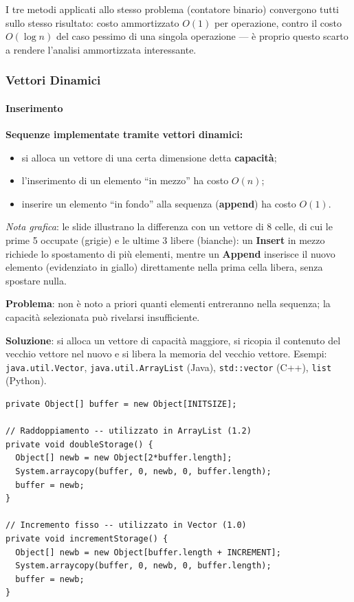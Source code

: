 \documentclass[12pt, a4paper]{article}
\begin{document}
\begin{tcolorbox}[colback=lightergray!5, colframe=tocsubsec, title=\textbf{Nota}]
I tre metodi applicati allo stesso problema (contatore binario) convergono tutti sullo stesso risultato: costo ammortizzato $O(1)$ per operazione, contro il costo $O(\log n)$ del caso pessimo di una singola operazione — è proprio questo scarto a rendere l'analisi ammortizzata interessante.
\end{tcolorbox}



\subsubsection{Vettori Dinamici}

\paragraph{Inserimento}

\textbf{Sequenze implementate tramite vettori dinamici:}
\begin{itemize}
    \item si alloca un vettore di una certa dimensione detta \textbf{capacità};
    \item l'inserimento di un elemento ``in mezzo'' ha costo $O(n)$;
    \item inserire un elemento ``in fondo'' alla sequenza (\textbf{append}) ha costo $O(1)$.
\end{itemize}

\textit{Nota grafica}: le slide illustrano la differenza con un vettore di 8 celle, di cui le prime 5 occupate (grigie) e le ultime 3 libere (bianche): un \textbf{Insert} in mezzo richiede lo spostamento di più elementi, mentre un \textbf{Append} inserisce il nuovo elemento (evidenziato in giallo) direttamente nella prima cella libera, senza spostare nulla.

\textbf{Problema}: non è noto a priori quanti elementi entreranno nella sequenza; la capacità selezionata può rivelarsi insufficiente.

\textbf{Soluzione}: si alloca un vettore di capacità maggiore, si ricopia il contenuto del vecchio vettore nel nuovo e si libera la memoria del vecchio vettore. Esempi: \texttt{java.util.Vector}, \texttt{java.util.ArrayList} (Java), \texttt{std::vector} (C++), \texttt{list} (Python).

\begin{verbatim}
private Object[] buffer = new Object[INITSIZE];

// Raddoppiamento -- utilizzato in ArrayList (1.2)
private void doubleStorage() {
  Object[] newb = new Object[2*buffer.length];
  System.arraycopy(buffer, 0, newb, 0, buffer.length);
  buffer = newb;
}

// Incremento fisso -- utilizzato in Vector (1.0)
private void incrementStorage() {
  Object[] newb = new Object[buffer.length + INCREMENT];
  System.arraycopy(buffer, 0, newb, 0, buffer.length);
  buffer = newb;
}
\end{verbatim}
\end{document}
